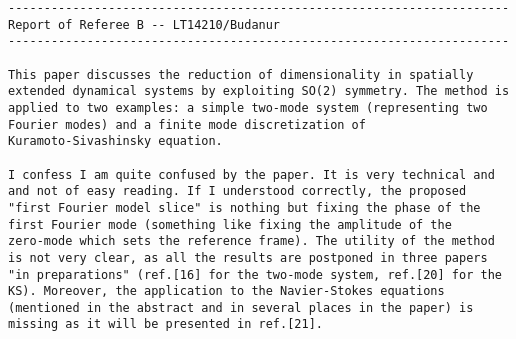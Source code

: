 {\small
\begin{verbatim}
----------------------------------------------------------------------
Report of Referee B -- LT14210/Budanur
----------------------------------------------------------------------

This paper discusses the reduction of dimensionality in spatially
extended dynamical systems by exploiting SO(2) symmetry. The method is
applied to two examples: a simple two-mode system (representing two
Fourier modes) and a finite mode discretization of
Kuramoto-Sivashinsky equation.

I confess I am quite confused by the paper. It is very technical and
and not of easy reading. If I understood correctly, the proposed
"first Fourier model slice" is nothing but fixing the phase of the
first Fourier mode (something like fixing the amplitude of the
zero-mode which sets the reference frame). The utility of the method
is not very clear, as all the results are postponed in three papers
"in preparations" (ref.[16] for the two-mode system, ref.[20] for the
KS). Moreover, the application to the Navier-Stokes equations
(mentioned in the abstract and in several places in the paper) is
missing as it will be presented in ref.[21].


\end{verbatim}}
